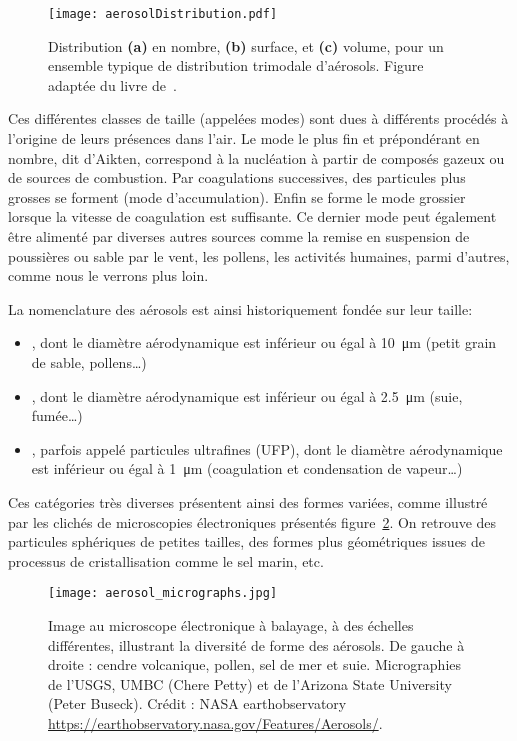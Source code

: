 \begin{figure}[ht]
    \centering
    \texttt{[image: aerosolDistribution.pdf]}
    \caption{Distribution \textbf{(a)} en nombre, \textbf{(b)} surface, et
        \textbf{(c)} volume, pour un ensemble typique de distribution trimodale
        d'aérosols. Figure adaptée du livre de~\cite{seinfieldAtmospheric1998}.}
    \label{fig:aerosolDistribution}
\end{figure}

Ces différentes classes de taille (appelées modes) sont dues à différents procédés à
l'origine de leurs présences dans l'air. Le mode le plus fin et prépondérant en nombre,
dit d'Aikten, correspond à la nucléation à partir de composés gazeux ou de sources de
combustion.  Par coagulations successives, des particules plus grosses se forment (mode
d'accumulation).  Enfin se forme le mode grossier lorsque la vitesse de coagulation est
suffisante. Ce dernier mode peut également être alimenté par diverses autres sources
comme la remise en suspension de poussières ou sable par le vent, les pollens, les
activités humaines, parmi d'autres, comme nous le verrons plus loin.

La nomenclature des aérosols est ainsi historiquement fondée sur leur taille:
\begin{itemize}
    \item \PMdix, dont le diamètre aérodynamique est inférieur ou égal à \SI{10}{\um} (petit
        grain de sable, pollens…)
    \item \PMdc, dont le diamètre aérodynamique est inférieur ou égal à \SI{2.5}{\um}
        (suie, fumée…)
    \item \PMun, parfois appelé particules ultrafines (UFP), dont le diamètre
        aérodynamique est inférieur ou égal à \SI{1}{\um} (coagulation et condensation de
        vapeur…)
\end{itemize}


Ces catégories très diverses présentent ainsi des formes variées, comme illustré par les
clichés de microscopies électroniques présentés figure~\ref{fig:micrography}. On retrouve
des particules sphériques de petites tailles, des formes plus géométriques issues de
processus de cristallisation comme le sel marin, etc.

\begin{figure}[ht]
    \centering
    \texttt{[image: aerosol\_micrographs.jpg]}
    \caption{Image au microscope électronique à balayage, à des échelles différentes,
        illustrant la diversité de forme des aérosols.
        De gauche à droite : cendre volcanique, pollen, sel de mer et suie. Micrographies de
        l'USGS, UMBC (Chere Petty) et de l'Arizona State University (Peter Buseck). 
        Crédit : NASA earthobservatory \url{https://earthobservatory.nasa.gov/Features/Aerosols/}.
    }
    \label{fig:micrography}
\end{figure}

